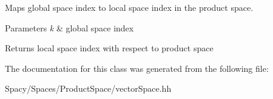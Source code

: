 Maps global space index to local space index in the product space. 


\begin{DoxyParams}{Parameters}
{\em k} & global space index \\
\hline
\end{DoxyParams}
\begin{DoxyReturn}{Returns}
local space index with respect to product space 
\end{DoxyReturn}


The documentation for this class was generated from the following file\+:\begin{DoxyCompactItemize}
\item 
Spacy/\+Spaces/\+Product\+Space/vector\+Space.\+hh\end{DoxyCompactItemize}
